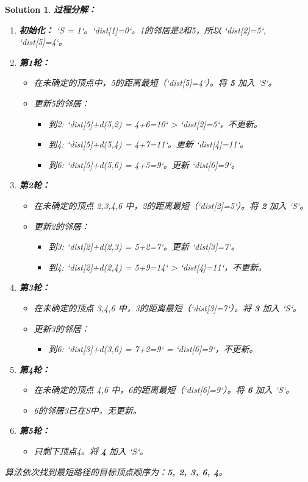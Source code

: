 \documentclass[UTF8]{report}
\newtheorem{solution}{Solution}
\theoremstyle{MyLineTheoremStyle} %
\theoremstyle{MyBlockTheoremStyle} %
\theoremstyle{MySubsubsectionStyle} %
\begin{document}
\begin{solution}
\textbf{过程分解：}
\begin{enumerate}
    \item \textbf{初始化：} `S = {1}`。`dist[1]=0`。1的邻居是2和5，所以 `dist[2]=5`, `dist[5]=4`。
    \item \textbf{第1轮：}
    \begin{itemize}
        \item 在未确定的顶点中，5的距离最短（`dist[5]=4`）。将 \textbf{5} 加入 `S`。
        \item 更新5的邻居：
        \begin{itemize}
            \item 到2: `dist[5]+d(5,2) = 4+6=10` > `dist[2]=5`，不更新。
            \item 到4: `dist[5]+d(5,4) = 4+7=11`。更新 `dist[4]=11`。
            \item 到6: `dist[5]+d(5,6) = 4+5=9`。更新 `dist[6]=9`。
        \end{itemize}
    \end{itemize}
    \item \textbf{第2轮：}
    \begin{itemize}
        \item 在未确定的顶点 {2,3,4,6} 中，2的距离最短（`dist[2]=5`）。将 \textbf{2} 加入 `S`。
        \item 更新2的邻居：
        \begin{itemize}
            \item 到3: `dist[2]+d(2,3) = 5+2=7`。更新 `dist[3]=7`。
            \item 到4: `dist[2]+d(2,4) = 5+9=14` > `dist[4]=11`，不更新。
        \end{itemize}
    \end{itemize}
    \item \textbf{第3轮：}
    \begin{itemize}
        \item 在未确定的顶点 {3,4,6} 中，3的距离最短（`dist[3]=7`）。将 \textbf{3} 加入 `S`。
        \item 更新3的邻居：
        \begin{itemize}
            \item 到6: `dist[3]+d(3,6) = 7+2=9` = `dist[6]=9`，不更新。
        \end{itemize}
    \end{itemize}
    \item \textbf{第4轮：}
    \begin{itemize}
        \item 在未确定的顶点 {4,6} 中，6的距离最短（`dist[6]=9`）。将 \textbf{6} 加入 `S`。
        \item 6的邻居3已在S中，无更新。
    \end{itemize}
    \item \textbf{第5轮：}
    \begin{itemize}
        \item 只剩下顶点4。将 \textbf{4} 加入 `S`。
    \end{itemize}
\end{enumerate}

算法依次找到最短路径的目标顶点顺序为：\textbf{5, 2, 3, 6, 4}。
\end{solution}
\end{document}
